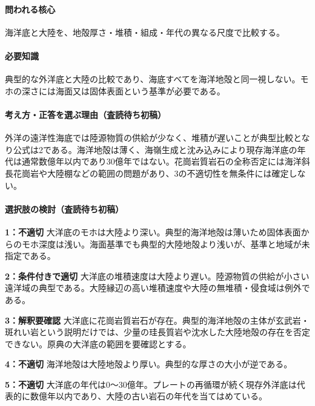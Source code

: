 \paragraph{問われる核心} 海洋底と大陸を、地殻厚さ・堆積・組成・年代の異なる尺度で比較する。

\paragraph{必要知識} 典型的な外洋底と大陸の比較であり、海底すべてを海洋地殻と同一視しない。モホの深さには海面又は固体表面という基準が必要である。

\paragraph{考え方・正答を選ぶ理由（査読待ち初稿）} 外洋の遠洋性海底では陸源物質の供給が少なく、堆積が遅いことが典型比較となり公式は2である。海洋地殻は薄く、海嶺生成と沈み込みにより現存海洋底の年代は通常数億年以内であり30億年ではない。花崗岩質岩石の全称否定には海洋斜長花崗岩や大陸棚などの範囲の問題があり、3の不適切性を無条件には確定しない。

\paragraph{選択肢の検討（査読待ち初稿）}\mbox{}\par

\noindent\textbf{1：不適切} 大洋底のモホは大陸より深い。典型的海洋地殻は薄いため固体表面からのモホ深度は浅い。海面基準でも典型的大陸地殻より浅いが、基準と地域が未指定である。\par

\noindent\textbf{2：条件付きで適切} 大洋底の堆積速度は大陸より遅い。陸源物質の供給が小さい遠洋域の典型である。大陸縁辺の高い堆積速度や大陸の無堆積・侵食域は例外である。\par

\noindent\textbf{3：解釈要確認} 大洋底に花崗岩質岩石が存在。典型的海洋地殻の主体が玄武岩・斑れい岩という説明だけでは、少量の珪長質岩や沈水した大陸地殻の存在を否定できない。原典の大洋底の範囲を要確認とする。\par

\noindent\textbf{4：不適切} 海洋地殻は大陸地殻より厚い。典型的な厚さの大小が逆である。\par

\noindent\textbf{5：不適切} 大洋底の年代は0〜30億年。プレートの再循環が続く現存外洋底は代表的に数億年以内であり、大陸の古い岩石の年代を当てはめている。\par

